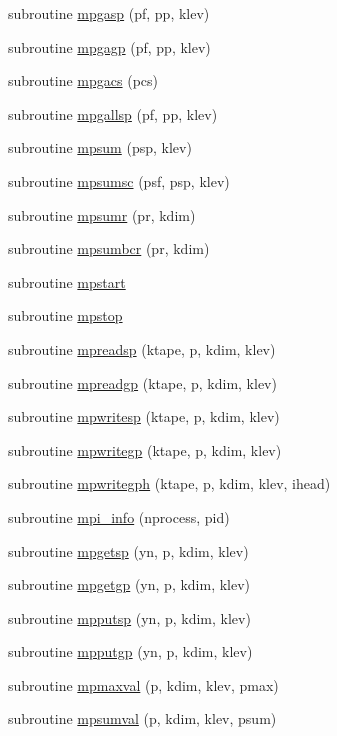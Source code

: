 \begin{DoxyCompactItemize}
subroutine \hyperlink{mpimod__stub_8f90_ac053a575b1230f8e4a296164dba5ab27}{mpgasp} (pf, pp, klev)
\item 
subroutine \hyperlink{mpimod__stub_8f90_aaa1210298789f4fd7b7702c276eb80a9}{mpgagp} (pf, pp, klev)
\item 
subroutine \hyperlink{mpimod__stub_8f90_a5aef7e33503e0c46b1d8c0b984c398d1}{mpgacs} (pcs)
\item 
subroutine \hyperlink{mpimod__stub_8f90_a54cf45feb57177de8eaab2e6b01a7aa2}{mpgallsp} (pf, pp, klev)
\item 
subroutine \hyperlink{mpimod__stub_8f90_af894efd9525c935f22415e017dcbc482}{mpsum} (psp, klev)
\item 
subroutine \hyperlink{mpimod__stub_8f90_a75a681a8d4b9ab5ba0d4fa97f909647b}{mpsumsc} (psf, psp, klev)
\item 
subroutine \hyperlink{mpimod__stub_8f90_af2111ef6d5b772479a74e94d351440f0}{mpsumr} (pr, kdim)
\item 
subroutine \hyperlink{mpimod__stub_8f90_ad703e6ecd123e9b8280322e402d57d20}{mpsumbcr} (pr, kdim)
\item 
subroutine \hyperlink{mpimod__stub_8f90_a41bbd9334a3d0412c73399d699bbb237}{mpstart}
\item 
subroutine \hyperlink{mpimod__stub_8f90_ac80e83b9bc0a4b459fed5f3b79cfafa0}{mpstop}
\item 
subroutine \hyperlink{mpimod__stub_8f90_a4aceba15459fefd864a0ed3313b0073d}{mpreadsp} (ktape, p, kdim, klev)
\item 
subroutine \hyperlink{mpimod__stub_8f90_a463456bde27045e2cf286e6e6082b9aa}{mpreadgp} (ktape, p, kdim, klev)
\item 
subroutine \hyperlink{mpimod__stub_8f90_aca5ad2279542f783c1d862333da96744}{mpwritesp} (ktape, p, kdim, klev)
\item 
subroutine \hyperlink{mpimod__stub_8f90_a3e3ab4b6cd8d7863f7bfc0e74b370488}{mpwritegp} (ktape, p, kdim, klev)
\item 
subroutine \hyperlink{mpimod__stub_8f90_a325e1b8f8412b422a06fb7558f212f7e}{mpwritegph} (ktape, p, kdim, klev, ihead)
\item 
subroutine \hyperlink{mpimod__stub_8f90_acb4faf87d9aa8c0bfc86d75f261989c5}{mpi\-\_\-info} (nprocess, pid)
\item 
subroutine \hyperlink{mpimod__stub_8f90_acf82ae878fff75151cab59cdd0925ae0}{mpgetsp} (yn, p, kdim, klev)
\item 
subroutine \hyperlink{mpimod__stub_8f90_a58d54c2e0590e63a7459417831afe5cf}{mpgetgp} (yn, p, kdim, klev)
\item 
subroutine \hyperlink{mpimod__stub_8f90_a79c341b7b52bf44470898581072660b8}{mpputsp} (yn, p, kdim, klev)
\item 
subroutine \hyperlink{mpimod__stub_8f90_a7e675330db7b46cf0bf0cc8edd2d413c}{mpputgp} (yn, p, kdim, klev)
\item 
subroutine \hyperlink{mpimod__stub_8f90_a1b6ac2b98059a43359ac0edfeb9c2ad7}{mpmaxval} (p, kdim, klev, pmax)
\item 
subroutine \hyperlink{mpimod__stub_8f90_ac1dfb34daad89cf72ff04b6a58919b2b}{mpsumval} (p, kdim, klev, psum)
\end{DoxyCompactItemize}


